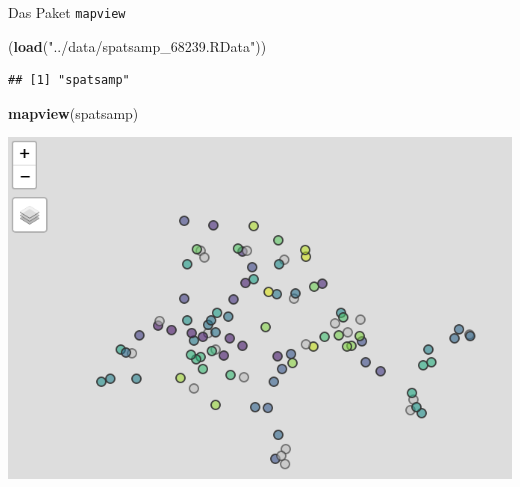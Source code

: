 \documentclass[ignorenonframetext,]{beamer}
\newenvironment{Shaded}{\begin{snugshade}}{\end{snugshade}}
\newcommand{\KeywordTok}[1]{\textcolor[rgb]{0.26,0.66,0.93}{\textbf{#1}}}
\newcommand{\NormalTok}[1]{\textcolor[rgb]{0.74,0.68,0.62}{#1}}
\newcommand{\StringTok}[1]{\textcolor[rgb]{0.02,0.61,0.04}{#1}}
\begin{document}
\begin{frame}[fragile]{Das Paket \texttt{mapview}}
\protect\hypertarget{das-paket-mapview}{}

\begin{Shaded}
\begin{Highlighting}[]
\NormalTok{(}\KeywordTok{load}\NormalTok{(}\StringTok{"../data/spatsamp_68239.RData"}\NormalTok{))}
\end{Highlighting}
\end{Shaded}

\begin{verbatim}
## [1] "spatsamp"
\end{verbatim}

\begin{Shaded}
\begin{Highlighting}[]
\KeywordTok{mapview}\NormalTok{(spatsamp)}
\end{Highlighting}
\end{Shaded}

\includegraphics{figure/spatsamp.PNG}

\end{frame}
\end{document}
